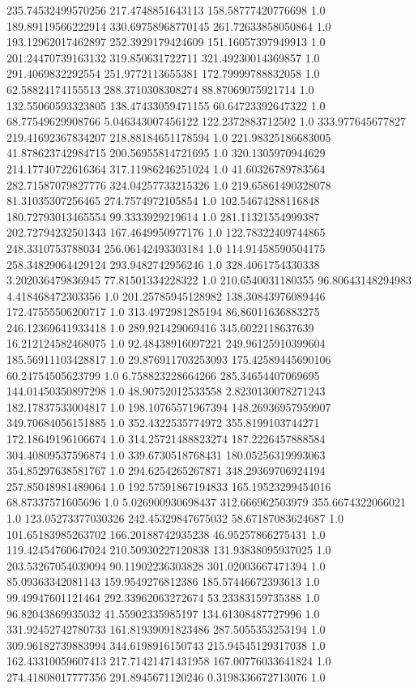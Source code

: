 235.74532499570256	217.4748851643113	158.58777420776698	1.0
189.89119566222914	330.69758968770145	261.72633858050864	1.0
193.12962017462897	252.3929179424609	151.16057397949913	1.0
201.24470739163132	319.850631722711	321.49230014369857	1.0
291.4069832292554	251.9772113655381	172.79999788832058	1.0
62.58824174155513	288.3710308308274	88.87069075921714	1.0
132.55060593323805	138.47433059471155	60.64723392647322	1.0
68.77549629908766	5.046343007456122	122.2372883712502	1.0
333.977645677827	219.41692367834207	218.88184651178594	1.0
221.98325186683005	41.878623742984715	200.56955814721695	1.0
320.1305970944629	214.17740722616364	317.11986246251024	1.0
41.60326789783564	282.71587079827776	324.04257733215326	1.0
219.65861490328078	81.31035307256465	274.7574972105854	1.0
102.54674288116848	180.72793013465554	99.3333929219614	1.0
281.11321554999387	202.72794232501343	167.4649950977176	1.0
122.78322409744865	248.3310753788034	256.06142493303184	1.0
114.91458590504175	258.34829064429124	293.9482742956246	1.0
328.4061754330338	3.202036479836945	77.81501334228322	1.0
210.6540031180355	96.80643148294983	4.418468472303356	1.0
201.25785945128982	138.30843976089446	172.47555506200717	1.0
313.4972981285194	86.86011636883275	246.12369641933418	1.0
289.921429069416	345.6022118637639	16.212124582468075	1.0
92.48438916097221	249.96125910399604	185.56911103428817	1.0
29.876911703253093	175.42589445690106	60.24754505623799	1.0
6.758823228664266	285.34654407069695	144.01450350897298	1.0
48.90752012533558	2.8230130078271243	182.17837533004817	1.0
198.10765571967394	148.26936957959907	349.70684056151885	1.0
352.4322535774972	355.8199103744271	172.18649196106674	1.0
314.25721488823274	187.2226457888584	304.40809537596874	1.0
339.6730518768431	180.05256319993063	354.85297638581767	1.0
294.6254265267871	348.29369706924194	257.85048981489064	1.0
192.57591867194833	165.19523299454016	68.87337571605696	1.0
5.026900930698437	312.666962503979	355.6674322066021	1.0
123.05273377030326	242.45329847675032	58.67187083624687	1.0
101.65183985263702	166.20188742935238	46.95257866275431	1.0
119.42454760647024	210.50930227120838	131.93838095937025	1.0
203.53267054039094	90.11902236303828	301.02003667471394	1.0
85.09363342081143	159.9549276812386	185.57446672393613	1.0
99.49947601121464	292.33962063272674	53.23383159735388	1.0
96.82043869935032	41.55902335985197	134.61308487727996	1.0
331.92452742780733	161.81939091823486	287.5055353253194	1.0
309.96182739883994	344.6198916150743	215.94545129317038	1.0
162.43310059607413	217.71421471431958	167.00776033641824	1.0
274.41808017777356	291.8945671120246	0.3198336672713076	1.0
